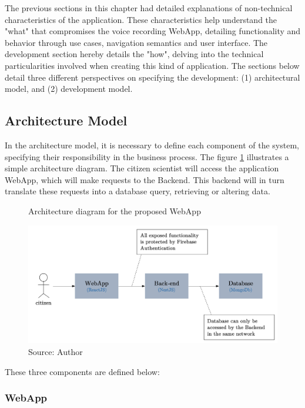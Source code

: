 The previous sections in this chapter had detailed explanations of non-technical characteristics of the application. These characteristics help understand the "what" that compromises the voice recording WebApp, detailing functionality and behavior through use cases, navigation semantics and user interface. The development section hereby details the "how", delving into the technical particularities involved when creating this kind of application. The sections below detail three different perspectives on specifying the development: (1) architectural model, and (2) development model.

\subsection{Architecture Model}
\label{sec:app-architecture}

In the architecture model, it is necessary to define each component of the system, specifying their responsibility in the business process. The figure \ref{fig:webapp-architecture} illustrates a simple architecture diagram. The citizen scientist will access the application WebApp, which will make requests to the Backend. This backend will in turn translate these requests into a database query, retrieving or altering data.

\begin{figure}[h]
    \centering
    \caption{Architecture diagram for the proposed WebApp}
    \label{fig:webapp-architecture}
    \includegraphics[width=\linewidth]{images/sw-req-spec/architecture.png}
    \caption*{Source: Author}
\end{figure}

These three components are defined below:

\subsubsection{WebApp}
\label{sec:backend-implementation}

